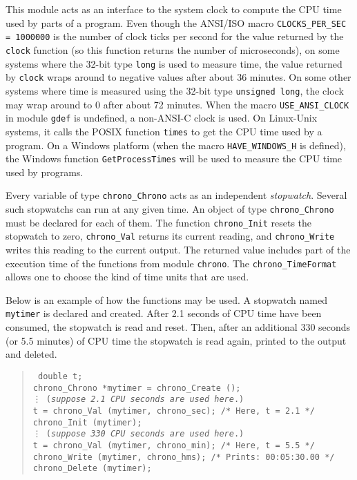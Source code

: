 
This module acts as an interface to the system clock to compute the
CPU time used by parts of a program.
  Even though the ANSI/ISO macro {\tt CLOCKS\_PER\_SEC = 1000000} 
  is the number of clock ticks per second for the value
  returned by the {\tt clock} function (so this function returns the
  number of microseconds), on some systems where the 32-bit type {\tt long} 
  is used to measure time, the value returned by {\tt clock}
  wraps around to negative values after about 36 minutes.
  On some other systems where time is measured using the 32-bit type
  {\tt unsigned long}, the clock may wrap around to 0 after about
   72 minutes.
  When the macro {\tt USE\_ANSI\_CLOCK} in module {\tt gdef} is undefined, 
  a non-ANSI-C clock is used. 
  On Linux-Unix systems, it calls the POSIX
  function {\tt times} to get the CPU time used by a program.
  On a Windows platform (when the macro \texttt{HAVE\_WINDOWS\_H} is defined),
  the Windows function \texttt{GetProcessTimes} will be used to measure
  the CPU time used by programs.


Every variable of type {\tt chrono\_Chrono} acts as an independent 
{\em stopwatch}.  Several such stopwatchs can run at any given time.
An object of type {\tt chrono\_Chrono} must be declared 
for each of them.
The function {\tt chrono\_Init} resets the stopwatch to zero,
{\tt chrono\_Val\/} returns its current reading,
and {\tt chrono\_Write\/} writes this reading to the current output.
The returned value includes part of the execution time of the functions
from module {\tt chrono\/}.
The {\tt chrono\_TimeFormat} allows one to choose the kind of 
time units that are used.  

Below is an example of how the functions may be used.
A stopwatch named {\tt mytimer} is declared and created.
After 2.1 seconds of CPU time have been consumed, the stopwatch is read and
reset. Then, after an additional 330 seconds (or 5.5 minutes) of CPU time
the stopwatch is read again, printed to the output and deleted.
%
 \begin{verse}{\tt
  double t; \\
  chrono\_Chrono *mytimer = chrono\_Create (); \\
\hskip 1.0cm   \vdots 
\hskip 1.0cm  ({\em suppose 2.1 CPU seconds are used here}.)\\[6pt]
  t = chrono\_Val (mytimer, chrono\_sec); \qquad   /* Here, t = 2.1 */ \\
  chrono\_Init (mytimer); \\
\hskip 1.0cm  \vdots
\hskip 1.0cm ({\em suppose 330 CPU seconds are used here}.) \\[10pt]
  t = chrono\_Val (mytimer, chrono\_min); \qquad    /* Here, t = 5.5 */\\
  chrono\_Write (mytimer, chrono\_hms);  \qquad  /* Prints: 00:05:30.00 */\\
  chrono\_Delete (mytimer);
 }\end{verse}

